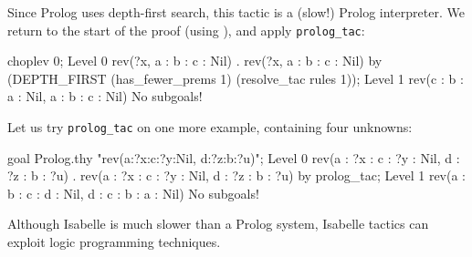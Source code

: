 Since Prolog uses depth-first search, this tactic is a (slow!) 
Prolog interpreter.  We return to the start of the proof (using
), and apply {\tt prolog_tac}:
\begin{ttbox}
choplev 0;
{\out Level 0}
{\out rev(?x, a : b : c : Nil)}
{. rev(?x, a : b : c : Nil)}
\ttbreak
by (DEPTH_FIRST (has_fewer_prems 1) (resolve_tac rules 1));
{\out Level 1}
{\out rev(c : b : a : Nil, a : b : c : Nil)}
{\out No subgoals!}
\end{ttbox}
Let us try {\tt prolog_tac} on one more example, containing four unknowns:
\begin{ttbox}
goal Prolog.thy "rev(a:?x:c:?y:Nil, d:?z:b:?u)";
{\out Level 0}
{\out rev(a : ?x : c : ?y : Nil, d : ?z : b : ?u)}
{. rev(a : ?x : c : ?y : Nil, d : ?z : b : ?u)}
\ttbreak
by prolog_tac;
{\out Level 1}
{\out rev(a : b : c : d : Nil, d : c : b : a : Nil)}
{\out No subgoals!}
\end{ttbox}
Although Isabelle is much slower than a Prolog system, Isabelle
tactics can exploit logic programming techniques.  

